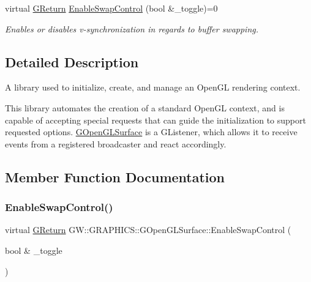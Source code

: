\begin{DoxyCompactItemize}
virtual \hyperlink{namespaceGW_a67a839e3df7ea8a5c5686613a7a3de21}{G\+Return} \hyperlink{classGW_1_1GRAPHICS_1_1GOpenGLSurface_aac6bf37c49a8f27fb746edf522c90fff}{Enable\+Swap\+Control} (bool \&\+\_\+toggle)=0
\begin{DoxyCompactList}\small\item\em Enables or disables v-\/synchronization in regards to buffer swapping. \end{DoxyCompactList}\end{DoxyCompactItemize}


\subsection{Detailed Description}
A library used to initialize, create, and manage an Open\+GL rendering context. 

This library automates the creation of a standard Open\+GL context, and is capable of accepting special requests that can guide the initialization to support requested options. \hyperlink{classGW_1_1GRAPHICS_1_1GOpenGLSurface}{G\+Open\+G\+L\+Surface} is a G\+Listener, which allows it to receive events from a registered broadcaster and react accordingly. 

\subsection{Member Function Documentation}
\mbox{\label{classGW_1_1GRAPHICS_1_1GOpenGLSurface_aac6bf37c49a8f27fb746edf522c90fff}} 
\subsubsection{\texorpdfstring{Enable\+Swap\+Control()}{EnableSwapControl()}}
{\footnotesize\ttfamily virtual \hyperlink{namespaceGW_a67a839e3df7ea8a5c5686613a7a3de21}{G\+Return} G\+W\+::\+G\+R\+A\+P\+H\+I\+C\+S\+::\+G\+Open\+G\+L\+Surface\+::\+Enable\+Swap\+Control (\begin{DoxyParamCaption}\item[{bool \&}]{\+\_\+toggle }\end{DoxyParamCaption})\hspace{0.3cm}{\ttfamily [pure virtual]}}




